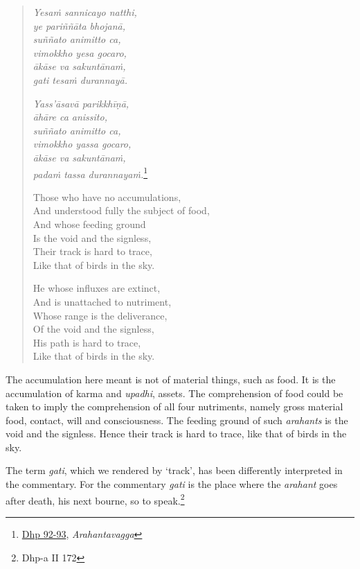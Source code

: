\begin{quote}
\emph{Yesaṁ sannicayo natthi,}\\
\emph{ye pariññāta bhojanā,}\\
\emph{suññato animitto ca,}\\
\emph{vimokkho yesa gocaro,}\\
\emph{ākāse va sakuntānaṁ,}\\
\emph{gati tesaṁ durannayā.}

\emph{Yass'āsavā parikkhīṇā,}\\
\emph{āhāre ca anissito,}\\
\emph{suññato animitto ca,}\\
\emph{vimokkho yassa gocaro,}\\
\emph{ākāse va sakuntānaṁ,}\\
\emph{padaṁ tassa durannayaṁ.}\footnote{\href{https://suttacentral.net/dhp90-99/pli/ms}{Dhp 92-93}, \emph{Arahantavagga}}

Those who have no accumulations,\\
And understood fully the subject of food,\\
And whose feeding ground\\
Is the void and the signless,\\
Their track is hard to trace,\\
Like that of birds in the sky.

He whose influxes are extinct,\\
And is unattached to nutriment,\\
Whose range is the deliverance,\\
Of the void and the signless,\\
His path is hard to trace,\\
Like that of birds in the sky.
\end{quote}

The accumulation here meant is not of material things, such as food. It is the accumulation of karma and \emph{upadhi}, assets. The comprehension of food could be taken to imply the comprehension of all four nutriments, namely gross material food, contact, will and consciousness. The feeding ground of such \emph{arahants} is the void and the signless. Hence their track is hard to trace, like that of birds in the sky.

The term \emph{gati}, which we rendered by `track', has been differently interpreted in the commentary. For the commentary \emph{gati} is the place where the \emph{arahant} goes after death, his next bourne, so to speak.\footnote{Dhp-a II 172}

